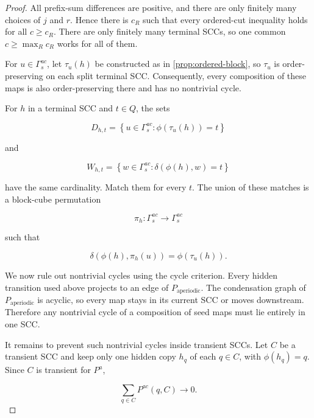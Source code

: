 \documentclass[10pt]{article}
\theoremstyle{definition}
\begin{document}
\begin{proof}
All prefix-sum differences are positive, and there are only finitely many
choices of $j$ and $r$.  Hence there is $c_R$ such that every ordered-cut
inequality holds for all $c\ge c_R$.  There are only finitely many terminal
SCCs, so one common $c\ge\max_R c_R$ works for all of them.

For $u\in\Gamma_s^{ac}$, let $\tau_u(h)$ be constructed as in
\cref{prop:ordered-block}, so $\tau_u$ is order-preserving on each split
terminal SCC.  Consequently, every composition of these maps is also
order-preserving there and has no nontrivial cycle.

For $h$ in a terminal SCC and $t\in Q$, the sets

\begin{equation}
 D_{h,t}
 =
 \left\{
  u\in\Gamma_s^{ac}:\phi(\tau_u(h))=t
 \right\}
\end{equation}

and

\begin{equation}
 W_{h,t}
 =
 \left\{
  w\in\Gamma_s^{ac}:\delta(\phi(h),w)=t
 \right\}
\end{equation}

have the same cardinality.  Match them for every $t$.  The union of these
matches is a block-cube permutation

\begin{equation}
 \pi_h:\Gamma_s^{ac}\longrightarrow\Gamma_s^{ac}
\end{equation}

such that

\begin{equation}
 \delta(\phi(h),\pi_h(u))=\phi(\tau_u(h)).
 \label{eq:projection-block}
\end{equation}

We now rule out nontrivial cycles using the cycle criterion.  Every hidden
transition used above projects to an edge of $P_{\mathrm{aperiodic}}$.  The
condensation graph of $P_{\mathrm{aperiodic}}$ is acyclic, so every map stays
in its current SCC or moves downstream.  Therefore any nontrivial cycle of a
composition of seed maps must lie entirely in one SCC.

It remains to prevent such nontrivial cycles inside transient SCCs.  Let $C$
be a transient SCC and keep only one hidden copy $h_q$ of each $q\in C$, with
$\phi(h_q)=q$.  Since $C$ is transient for $P^a$,

\begin{equation}
 \sum_{q\in C}P^{ac}(q,C)\longrightarrow0.
\end{equation}


\end{proof}
\end{document}

